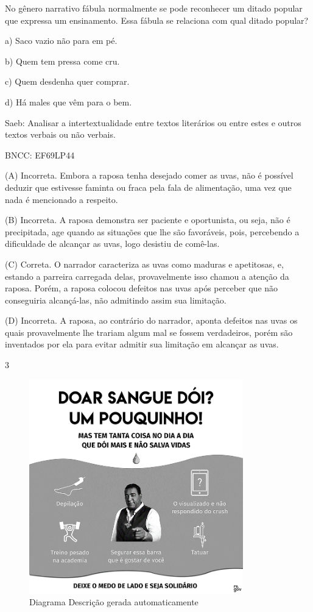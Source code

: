 No gênero narrativo fábula normalmente se pode reconhecer um ditado
popular que expressa um ensinamento. Essa fábula se relaciona com qual
ditado popular?

a) Saco vazio não para em pé.

b) Quem tem pressa come cru.

c) Quem desdenha quer comprar.

d) Há males que vêm para o bem.

Saeb: Analisar a intertextualidade entre textos literários ou entre
estes e outros textos verbais ou não verbais.

BNCC: EF69LP44

(A) Incorreta. Embora a raposa tenha desejado comer as uvas, não é
possível deduzir que estivesse faminta ou fraca pela fala de
alimentação, uma vez que nada é mencionado a respeito.

(B) Incorreta. A raposa demonstra ser paciente e oportunista, ou seja,
não é precipitada, age quando as situações que lhe são favoráveis, pois,
percebendo a dificuldade de alcançar as uvas, logo desistiu de comê-las.

(C) Correta. O narrador caracteriza as uvas como maduras e apetitosas,
e, estando a parreira carregada delas, provavelmente isso chamou a
atenção da raposa. Porém, a raposa colocou defeitos nas uvas após
perceber que não conseguiria alcançá-las, não admitindo assim sua
limitação.

(D) Incorreta. A raposa, ao contrário do narrador, aponta defeitos nas
uvas os quais provavelmente lhe trariam algum mal se fossem verdadeiros,
porém são inventados por ela para evitar admitir sua limitação em
alcançar as uvas.

\num{3}

\begin{figure}
\centering
\includegraphics[width=3.65556in,height=3.65556in]{./imgSAEB_8_POR/media/image38.png}
\caption{Diagrama Descrição gerada automaticamente}
\end{figure}

